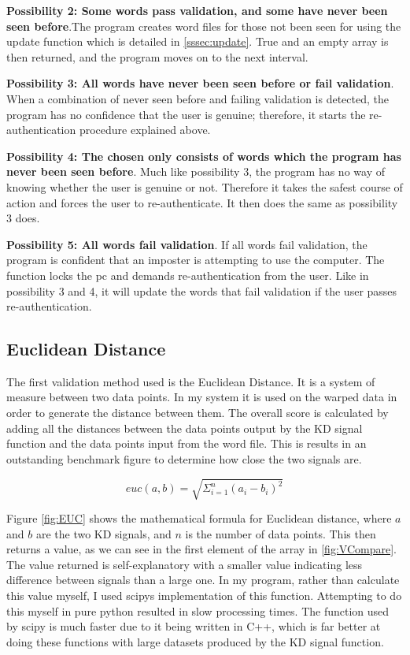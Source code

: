 \documentclass[10pt,a4paper]{report}
\begin{document}
\textbf{Possibility 2: Some words pass validation, and some have never been seen before}.The program creates word files for those not been seen for using the update function which is detailed in \ref{sssec:update}. True and an empty array is then returned, and the program moves on to the next interval.

\textbf{Possibility 3: All words have never been seen before or fail validation}. When a combination of never seen before and failing validation is detected, the program has no confidence that the user is genuine; therefore, it starts the re-authentication procedure explained above.

\textbf{Possibility 4: The chosen only consists of words which the program has never been seen before}. Much like possibility 3, the program has no way of knowing whether the user is genuine or not. Therefore it takes the safest course of action and forces the user to re-authenticate. It then does the same as possibility 3 does.

\textbf{Possibility 5: All words fail validation}. If all words fail validation, the program is confident that an imposter is attempting to use the computer. The function locks the pc and demands re-authentication from the user. Like in possibility 3 and 4, it will update the words that fail validation if the user passes re-authentication.

\subsection{Euclidean Distance}

The first validation method used is the Euclidean Distance. It is a system of measure between two data points. In my system it is used on the warped data in order to generate the distance between them. The overall score is calculated by adding all the distances between the data points output by the KD signal function and the data points input from the word file. This is results in an outstanding benchmark figure to determine how close the two signals are. 

\begin{equation}
\textit{euc}(a,b) = \sqrt{\Sigma^n_{i=1}(a_i-b_i)^2}
\label{fig:EUC}
\end{equation}

Figure \ref{fig:EUC} shows the mathematical formula for Euclidean distance, where \(a\) and \(b\) are the two KD signals, and \(n\) is the number of data points. This then returns a value, as we can see in the first element of the array in \ref{fig:VCompare}. The value returned is self-explanatory with a smaller value indicating less difference between signals than a large one. In my program, rather than calculate this value myself, I used scipys implementation of this function\cite{scipycommunity_2022}. Attempting to do this myself in pure python resulted in slow processing times. The function used by scipy is much faster due to it being written in C++, which is far better at doing these functions with large datasets produced by the KD signal function.
\end{document}
